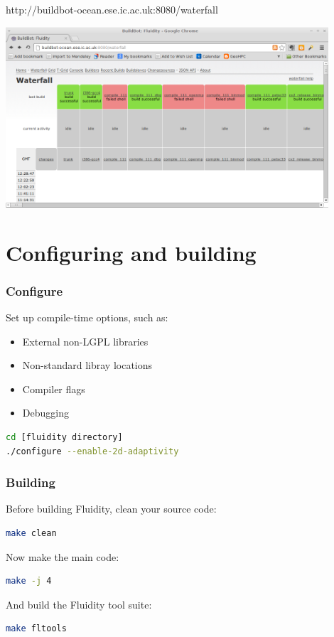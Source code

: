 \documentclass[12pt]{beamer}
\begin{document}
\begin{frame}
\begin{center}
http://buildbot-ocean.ese.ic.ac.uk:8080/waterfall

\includegraphics[width=0.9\textwidth]{images/buildbot.png}
\end{center}
\end{frame}

\section{Configuring and building}
\begin{frame}[fragile]
        \frametitle{Configure}
Set up compile-time options, such as:
\begin{itemize}
    \item External non-LGPL libraries
    \item Non-standard libray locations
    \item Compiler flags
    \item Debugging
\end{itemize}
\lstset{language=bash}
\begin{lstlisting}[language=bash,basicstyle=\ttfamily]
cd [fluidity directory]
./configure --enable-2d-adaptivity
\end{lstlisting}
\end{frame}

\begin{frame}[fragile]
        \frametitle{Building}
\lstset{language=bash}
Before building Fluidity, clean your source code:
\begin{lstlisting}[language=bash,basicstyle=\ttfamily]
make clean
\end{lstlisting}
Now make the main code:
\begin{lstlisting}[language=bash,basicstyle=\ttfamily]
make -j 4
\end{lstlisting}
And build the Fluidity tool suite:
\begin{lstlisting}[language=bash,basicstyle=\ttfamily]
make fltools
\end{lstlisting}



\end{frame}
\end{document}
